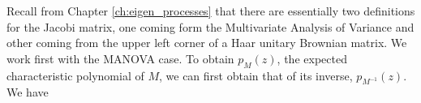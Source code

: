 








Recall from Chapter \ref{ch:eigen_processes} that there are essentially two definitions for the Jacobi matrix, one coming form the Multivariate Analysis of Variance and other coming from the upper left corner of a Haar unitary Brownian matrix. We work first with the MANOVA case. To obtain \( p_M(z) \), the expected characteristic polynomial of \( M \), we can first obtain that of its inverse, \( p_{M^{-1}}(z) \). We have

